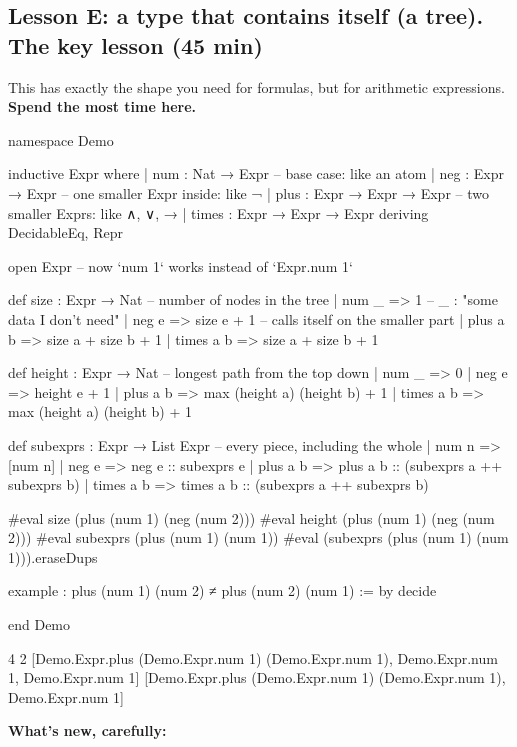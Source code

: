 \documentclass[11pt,a4paper]{article}
\begin{document}
\subsection{Lesson E: a type that contains itself (a tree). The key lesson (45 min)}
This has exactly the shape you need for formulas, but for arithmetic expressions. \textbf{Spend the most time here.}
\begin{lean}
namespace Demo

inductive Expr where
  | num   : Nat → Expr               -- base case: like an atom
  | neg   : Expr → Expr              -- one smaller Expr inside: like ¬
  | plus  : Expr → Expr → Expr       -- two smaller Exprs: like ∧, ∨, →
  | times : Expr → Expr → Expr
  deriving DecidableEq, Repr

open Expr      -- now `num 1` works instead of `Expr.num 1`

def size : Expr → Nat               -- number of nodes in the tree
  | num _     => 1                   -- _ : "some data I don't need"
  | neg e     => size e + 1          -- calls itself on the smaller part
  | plus a b  => size a + size b + 1
  | times a b => size a + size b + 1

def height : Expr → Nat             -- longest path from the top down
  | num _     => 0
  | neg e     => height e + 1
  | plus a b  => max (height a) (height b) + 1
  | times a b => max (height a) (height b) + 1

def subexprs : Expr → List Expr     -- every piece, including the whole
  | num n     => [num n]
  | neg e     => neg e :: subexprs e
  | plus a b  => plus a b :: (subexprs a ++ subexprs b)
  | times a b => times a b :: (subexprs a ++ subexprs b)

#eval size (plus (num 1) (neg (num 2)))
#eval height (plus (num 1) (neg (num 2)))
#eval subexprs (plus (num 1) (num 1))
#eval (subexprs (plus (num 1) (num 1))).eraseDups

example : plus (num 1) (num 2) ≠ plus (num 2) (num 1) := by decide

end Demo
\end{lean}
\begin{output}
4
2
[Demo.Expr.plus (Demo.Expr.num 1) (Demo.Expr.num 1), Demo.Expr.num 1, Demo.Expr.num 1]
[Demo.Expr.plus (Demo.Expr.num 1) (Demo.Expr.num 1), Demo.Expr.num 1]
\end{output}
\textbf{What's new, carefully:}
\end{document}
